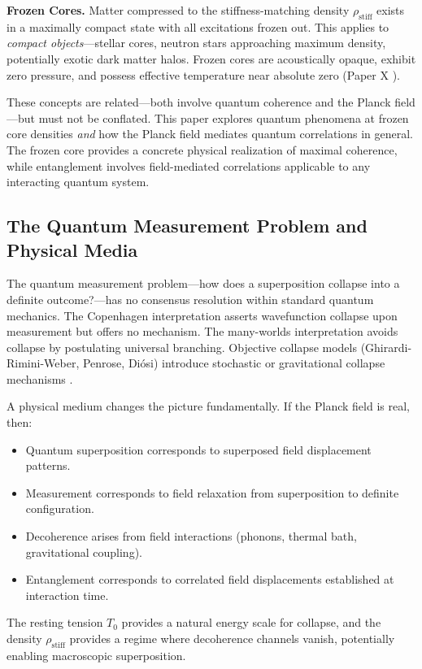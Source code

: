 \documentclass[11pt,a4paper]{article}
\newcommand{\rhostiff}{\ensuremath{\rho_{\mathrm{stiff}}}}
\newcommand{\Tzero}{\ensuremath{T_0}}
\theoremstyle{definition}
\theoremstyle{remark}
\begin{document}
\textbf{Frozen Cores.} Matter compressed to the stiffness-matching density $\rhostiff$ exists in a maximally compact state with all excitations frozen out. This applies to \emph{compact objects}---stellar cores, neutron stars approaching maximum density, potentially exotic dark matter halos. Frozen cores are acoustically opaque, exhibit zero pressure, and possess effective temperature near absolute zero (Paper X \cite{SkavbergFrozen2025}).

These concepts are related---both involve quantum coherence and the Planck field---but must not be conflated. This paper explores quantum phenomena at frozen core densities \emph{and} how the Planck field mediates quantum correlations in general. The frozen core provides a concrete physical realization of maximal coherence, while entanglement involves field-mediated correlations applicable to any interacting quantum system.

\subsection{The Quantum Measurement Problem and Physical Media}
\label{sec:measurement_problem}

The quantum measurement problem---how does a superposition collapse into a definite outcome?---has no consensus resolution within standard quantum mechanics. The Copenhagen interpretation asserts wavefunction collapse upon measurement but offers no mechanism. The many-worlds interpretation avoids collapse by postulating universal branching. Objective collapse models (Ghirardi-Rimini-Weber, Penrose, Di\'osi) introduce stochastic or gravitational collapse mechanisms \cite{Penrose1996,Diosi1989}.

A physical medium changes the picture fundamentally. If the Planck field is real, then:
\begin{itemize}[leftmargin=*, itemsep=0.2em]
\item Quantum superposition corresponds to superposed field displacement patterns.
\item Measurement corresponds to field relaxation from superposition to definite configuration.
\item Decoherence arises from field interactions (phonons, thermal bath, gravitational coupling).
\item Entanglement corresponds to correlated field displacements established at interaction time.
\end{itemize}

The resting tension $\Tzero$ provides a natural energy scale for collapse, and the density $\rhostiff$ provides a regime where decoherence channels vanish, potentially enabling macroscopic superposition.
\end{document}
